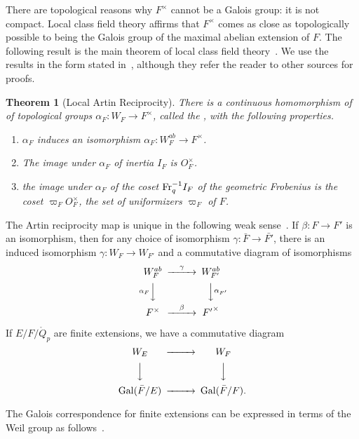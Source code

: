 \documentclass{amsart}
\newtheorem{theorem}[equation]{Theorem}
\def\oG{\op{Gal}}
\begin{document}
There are topological reasons why $F^\times$ cannot be a Galois group: it is not
compact.  Local class field theory affirms that $F^\times$ comes as close as topologically
possible to being the Galois group of the maximal abelian extension of $F$.
The following result is the main theorem of local class field theory~\cite{CFT}.
We use the results in the form stated in~\cite{bushnell-henniart}, although they
refer the reader to other sources for proofs.

\begin{theorem}[Local Artin Reciprocity]  There is a continuous homomorphism of
of topological groups $\alpha_F:W_F\to F^\times$, called the , with the following properties.
\begin{enumerate}
\item $\alpha_F$ induces an isomorphism $\alpha_F:W^{ab}_F \to F^\times$.
\item The image under $\alpha_F$ of inertia $I_F$  is $O_F^\times$.
\item the image under $\alpha_F$ of the coset ${\operatorname{Fr}}^{-1}_q I_F$ of
  the geometric Frobenius is the coset $\varpi_F O^\times_F$, the set of
  uniformizers $\varpi_F$ of $F$.
\end{enumerate}
\end{theorem}


The Artin reciprocity map is unique in the following weak
sense~\cite[29.1]{bushnell-henniart}.  If $\beta:F\to F'$ is an
isomorphism, then for any choice of isomorphism $\gamma:\bar{F}\to
\bar{F'}$, there is an induced isomorphism $\gamma:W_F\to W_{F'}$ and
a commutative diagram of isomorphisms
\[
\begin{CD}
W_F^{ab} @>\gamma>> W_{F'}^{ab}\\
@V\alpha_FVV @VV\alpha_{F'}V\\
F^\times @>\beta >> {F'}^\times
\end{CD}
\]

If $E/F/\ring{Q}_p$ are finite extensions, we have a commutative
diagram
\[
\begin{CD}
W_E @>>> W_F\\
@VVV @VVV\\
\oG(\bar{F}/E) @>>> \oG(\bar{F}/F).
\end{CD}
\]

The Galois correspondence for finite extensions can be expressed in terms of
the Weil group as follows~\cite[Prop. 28.5]{bushnell-henniart}.
\end{document}
